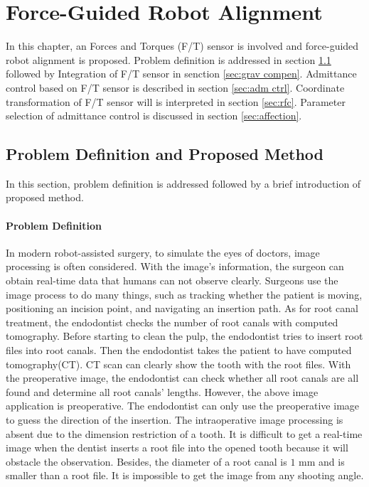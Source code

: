 \chapter{Force-Guided Robot Alignment}
\label{chapter4}
\hspace*{6mm}In this chapter, an Forces and Torques (F/T) sensor is involved and force-guided robot alignment is proposed. Problem definition is addressed in section \ref{sec:pro def} followed by Integration of F/T sensor in senction \ref{sec:grav compen}. Admittance control based on F/T sensor is described in section \ref{sec:adm ctrl}. Coordinate transformation of F/T sensor will is interpreted in section \ref{sec:rfc}. Parameter selection of  admittance control is discussed in section \ref{sec:affection}.
\section{Problem Definition and Proposed Method}
\label{sec:pro def}
\hspace*{6mm}In this section, problem definition is addressed followed by a brief introduction of proposed method.
\subsubsection{Problem Definition}
\hspace*{6mm}In modern robot-assisted surgery, to simulate the eyes of doctors,  image processing is often considered. With the image's information, the surgeon can obtain real-time data that humans can not observe clearly. Surgeons use the image process to do many things, such as tracking whether the patient is moving, positioning an incision point, and navigating an insertion path. As for root canal treatment, the endodontist checks the number of root canals with computed tomography.  Before starting to clean the pulp, the endodontist tries to insert root files into root canals. Then the endodontist takes the patient to have computed tomography(CT). CT scan can clearly show the tooth with the root files. With the preoperative image, the endodontist can check whether all root canals are all found and determine all root canals' lengths. However, the above image application is preoperative. The endodontist can only use the preoperative image to guess the direction of the insertion. The intraoperative image processing is absent due to the dimension restriction of a tooth. It is difficult to get a real-time image when the dentist inserts a root file into the opened tooth because it will obstacle the observation. Besides, the diameter of a root canal is $1$ mm and is smaller than a root file. It is impossible to get the image from any shooting angle.
